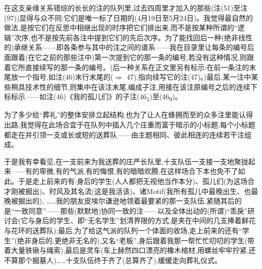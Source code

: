  在这支亲缘关系错综的长长的注的队列里,过去四周里才加入的那些(注(51)至注(97))显得与众不同:它们是唯一标了日期的(4月19日至5月24日)。我觉得最自然的做法,是按它们在反思中相继出现的时序把它们排出来,而不是按某种所谓的“逻辑”次序,也不是按先前各注中提到它们的先后次序。为了能找回后一种(绝非线性的)承继关系——即各条参与其中的注之间的谱系——我在目录里让每条的编号后面跟着(在它之前的那些注中)第一次提到它的那一条的编号,若没有这种情况,则跟着它所直接续写的那一条的编号。(后一种关系在正文里另有标示:在前一条注的末尾放一个指号,如注(46)末行末尾的($\Rightarrow$ 47),指向续写它的注(47)。)最后,某一注中某些稍具技术性的细节,则集中在该注末尾,编成子注,用接在该注原编号之后的连续下标标示——如注(46)《我的孤儿们》的子注(46\textsubscript{1})至(46\textsubscript{9})。

为了多少给“葬礼”的整体安排立起结构,也为了让人在蜂拥而至的众多注里能认得出路,我觉得在此场合宜于在队列中插入几个庄重而富于暗示的小标题,每个小标题都走在并引领一支或长或短的送葬队——由主题相同、彼此相连的连续若干注组成。

于是我有幸看见,在一支前来为我送葬的庄严长队里,十支队伍一支接一支地聚拢起来——有的卑微,有的气派,有的悔恨,有的暗暗欢腾,在这样场合下本也免不了如此。于是走上前来的有:身后的学生(人人都把无视他当作本分)、孤儿们(为这场合才刚被掘出)、时风及其名流(这是我活该)、诸Motif(我所有孤儿中最晚出生、也最晚被掘出的),
%
 ……我的朋友皮埃尔谦逊地领着最要紧的那一支队伍,紧随其后的是“一致同意”——那些(默默地)协同一致的注——以及全体出动的(所谓)“乖戾”研讨会(它与身后的学生、即“无名学生”划清界限的方式,是夹在中间的几支捧着鲜花与花环的送葬队);最后,为了给这气派的队列一个体面的收场,走上前来的还有“学生”(绝非身后的,更绝非无名的),又名“老板”,身后跟着我那一帮忙忙叨叨的学生(带着大量铁锹与绳索),最后是灵车(车上赫然四口漂亮的橡木棺材,用螺丝牢牢拧紧,还不算那个掘墓人)……十支队伍终于齐了(总算齐了),缓缓走向葬礼仪式。


